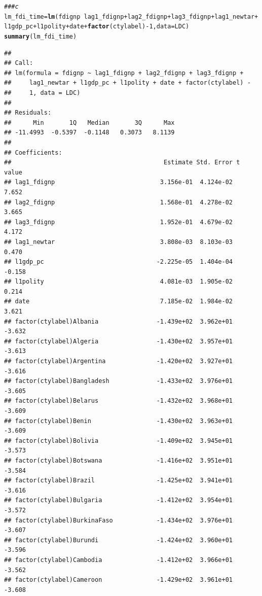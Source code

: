 \documentclass[12pt]{article}\usepackage[]{graphicx}\usepackage[]{color}
\makeatletter
\newcommand{\hlnum}[1]{\textcolor[rgb]{0.686,0.059,0.569}{#1}}%
\newcommand{\hlcom}[1]{\textcolor[rgb]{0.678,0.584,0.686}{\textit{#1}}}%
\newcommand{\hlopt}[1]{\textcolor[rgb]{0,0,0}{#1}}%
\newcommand{\hlstd}[1]{\textcolor[rgb]{0.345,0.345,0.345}{#1}}%
\newcommand{\hlkwb}[1]{\textcolor[rgb]{0.69,0.353,0.396}{#1}}%
\newcommand{\hlkwc}[1]{\textcolor[rgb]{0.333,0.667,0.333}{#1}}%
\newcommand{\hlkwd}[1]{\textcolor[rgb]{0.737,0.353,0.396}{\textbf{#1}}}%
\newenvironment{kframe}{%
 \def\at@end@of@kframe{}%
 \ifinner\ifhmode%
  \def\at@end@of@kframe{\end{minipage}}%
  \begin{minipage}{\columnwidth}%
 \fi\fi%
 \def\FrameCommand##1{\hskip\@totalleftmargin \hskip-\fboxsep
 \colorbox{shadecolor}{##1}\hskip-\fboxsep
     \hskip-\linewidth \hskip-\@totalleftmargin \hskip\columnwidth}%
 \MakeFramed {\advance\hsize-\width
   \@totalleftmargin\z@ \linewidth\hsize
   \@setminipage}}%
 {\par\unskip\endMakeFramed%
 \at@end@of@kframe}
\newenvironment{knitrout}{}{} %
\makeatother
\begin{document}
\begin{knitrout}
\color{fgcolor}\begin{kframe}
\begin{alltt}
\hlcom{### c}
\hlstd{lm_fdi_time} \hlkwb{=} \hlkwd{lm}\hlstd{(fdignp} \hlopt{~} \hlstd{lag1_fdignp} \hlopt{+} \hlstd{lag2_fdignp} \hlopt{+} \hlstd{lag3_fdignp} \hlopt{+} \hlstd{lag1_newtar} \hlopt{+}
    \hlstd{l1gdp_pc} \hlopt{+} \hlstd{l1polity} \hlopt{+} \hlstd{date} \hlopt{+} \hlkwd{factor}\hlstd{(ctylabel)} \hlopt{-} \hlnum{1}\hlstd{,} \hlkwc{data} \hlstd{= LDC)}
\hlkwd{summary}\hlstd{(lm_fdi_time)}
\end{alltt}
\begin{verbatim}
## 
## Call:
## lm(formula = fdignp ~ lag1_fdignp + lag2_fdignp + lag3_fdignp + 
##     lag1_newtar + l1gdp_pc + l1polity + date + factor(ctylabel) - 
##     1, data = LDC)
## 
## Residuals:
##      Min       1Q   Median       3Q      Max 
## -11.4993  -0.5397  -0.1148   0.3073   8.1139 
## 
## Coefficients:
##                                          Estimate Std. Error t value
## lag1_fdignp                             3.156e-01  4.124e-02   7.652
## lag2_fdignp                             1.568e-01  4.278e-02   3.665
## lag3_fdignp                             1.952e-01  4.679e-02   4.172
## lag1_newtar                             3.808e-03  8.103e-03   0.470
## l1gdp_pc                               -2.225e-05  1.404e-04  -0.158
## l1polity                                4.081e-03  1.905e-02   0.214
## date                                    7.185e-02  1.984e-02   3.621
## factor(ctylabel)Albania                -1.439e+02  3.962e+01  -3.632
## factor(ctylabel)Algeria                -1.430e+02  3.957e+01  -3.613
## factor(ctylabel)Argentina              -1.420e+02  3.927e+01  -3.616
## factor(ctylabel)Bangladesh             -1.433e+02  3.976e+01  -3.605
## factor(ctylabel)Belarus                -1.432e+02  3.968e+01  -3.609
## factor(ctylabel)Benin                  -1.430e+02  3.963e+01  -3.609
## factor(ctylabel)Bolivia                -1.409e+02  3.945e+01  -3.573
## factor(ctylabel)Botswana               -1.416e+02  3.951e+01  -3.584
## factor(ctylabel)Brazil                 -1.425e+02  3.941e+01  -3.616
## factor(ctylabel)Bulgaria               -1.412e+02  3.954e+01  -3.572
## factor(ctylabel)BurkinaFaso            -1.434e+02  3.976e+01  -3.607
## factor(ctylabel)Burundi                -1.424e+02  3.960e+01  -3.596
## factor(ctylabel)Cambodia               -1.412e+02  3.966e+01  -3.562
## factor(ctylabel)Cameroon               -1.429e+02  3.961e+01  -3.608

\end{verbatim}
\end{kframe}
\end{knitrout}
\end{document}
